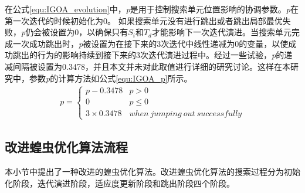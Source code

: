 在公式\ref{equ:IGOA_evolution}中，\emph{p}是用于控制搜索单元位置影响的协调参数。\emph{p}在第一次迭代的时候初始化为0。 如果搜索单元没有进行跳出或者跳出局部最优失败，\emph{p}仍会被设置为0，以确保只有$S_i$和$T_d$才能影响下一次迭代演进。当搜索单元完成一次成功跳出时，\emph{p}被设置为在接下来的3次迭代中线性递减为0的变量，以使成功跳出的行为的影响持续到接下来的3次迭代演进过程中。经过一些试验，\emph{p}的递减间隔被设置为0.3478，并且本文并未对此取值进行详细的研究讨论。这样在本研究中，参数\emph{p}的计算方法如公式\ref{equ:IGOA_p}所示。
\begin{eqnarray}\label{equ:IGOA_p}
    p= \begin{cases}
        p-0.3478 & p>0 \\
        0&p \leq 0 \\
        3\times 0.3478&when \  jumping \  out \  successfully
        \end{cases} 
\end{eqnarray}

\subsection{改进蝗虫优化算法流程}

本小节中提出了一种改进的蝗虫优化算法。改进蝗虫优化算法的搜索过程分为初始化阶段，迭代演进阶段，适应度更新阶段和跳出阶段四个阶段。


